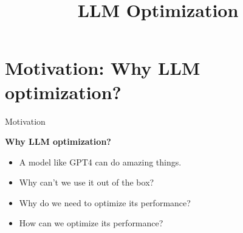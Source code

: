 



\newcommand{\titlefigure}{figure/gpt4logo.png}
\newcommand{\learninggoals}{
\item Learn how to optimize LLM performance
}

\title{LLM Optimization}
\date{}


\lecturechapter{}











\section{Motivation: Why LLM optimization?}

\begin{vbframe}{Motivation}

\vfill

\textbf{Why LLM optimization?}

	\begin{itemize}
		\item A model like GPT4 can do amazing
		things.
                \item Why can't we use it out of the box?
                \item Why do we need to optimize its performance?
                \item How can we  optimize its performance?
	\end{itemize}

\vfill

\end{vbframe}

\newpage

\

\newpage

